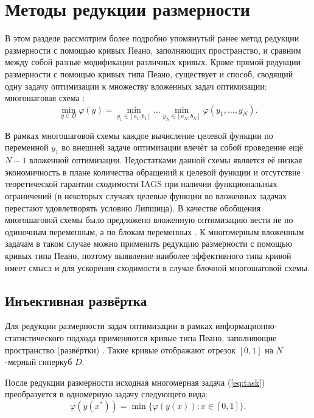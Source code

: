 \section{Методы редукции размерности}
В этом разделе рассмотрим более подробно упомянутый ранее метод редукции размерности
с помощью кривых Пеано, заполняющих пространство, и сравним между собой разные модификации различных кривых.
Кроме прямой редукции размерности с помощью кривых типа Пеано, существует и способ, сводящий одну задачу оптимизации к
множеству вложенных задач оптимизации: многошаговая схема \cite{strongin1978}:
\begin{equation}
  \label{eq:3}
  \min_{y \in D} \varphi(y) = \min_{y_1 \in [a_1, b_1]} \dots \min_{y_N \in [a_N, b_N]} \varphi(y_1, \dots, y_N).
\end{equation}

В рамках многошаговой схемы каждое вычисление целевой функции по переменной \(y_1\) во внешней задаче оптимизации влечёт за собой
проведение ещё \(N-1\) вложенной оптимизации. Недостатками данной схемы является её низкая экономичность в плане количества
обращений к целевой функции и отсутствие теоретической гарантии сходимости IAGS при наличии функциональных ограничений
(в некоторых случаях целевые функции во вложенных задачах перестают удовлетворять условию Липшица). В качестве обобщения
многошаговой схемы было предложено вложенную оптимизацию вести не по одиночным переменным, а по блокам переменных \cite{globalizerSystem}.
К многомерным вложенным задачам в таком случае можно применить редукцию размерности с помощью кривых типа Пеано,
поэтому выявление наиболее эффективного типа кривой имеет смысл и для ускорения сходимости в случае блочной многошаговой схемы.

\subsection{Инъективная развёртка}

Для редукции размерности задач оптимизации в рамках информационно-статистического подхода
применяются кривые типа Пеано, заполняющие пространство (развёртки) \cite{Sergeyev2013, strongin1978,
Gergel2009, Strongin2000}. Такие кривые отображают отрезок \([0,1]\) на \(N\)-мерный гиперкуб \(D\).

После редукции размерности исходная многомерная задача (\ref{eq:task}) преобразуется в одномерную задачу
следующего вида:
\begin{equation}
\label{eq:oneDimTask}
\varphi(y(x^*))=\min\{\varphi(y(x)):x\in [0,1]\}.
\end{equation}

